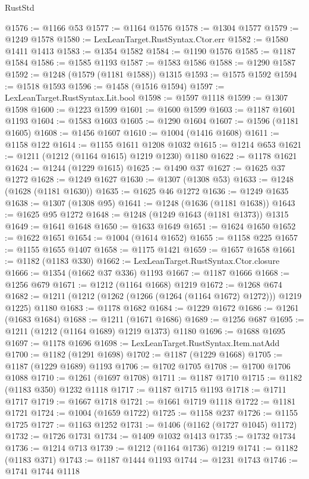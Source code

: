 \begin{lexlean}{RustStd}
\begin{coremodule}
@1576 := @1166 @53
@1577 := @1164 @1576
@1578 := @1304 @1577
@1579 := @1249 @1578
@1580 := LexLeanTarget.RustSyntax.Ctor.err
@1582 := @1580 @1411 @1413
@1583 := @1354 @1582
@1584 := @1190 @1576
@1585 := @1187 @1584
@1586 := @1585 @1193
@1587 := @1583 @1586
@1588 := @1290 @1587
@1592 := @1248 (@1579 (@1181 @1588)) @1315
@1593 := @1575 @1592
@1594 := @1518 @1593
@1596 := @1458 (@1516 @1594)
@1597 := LexLeanTarget.RustSyntax.Lit.bool
@1598 := @1597 @1118
@1599 := @1307 @1598
@1600 := @1223 @1599
@1601 := @1600 @1599
@1603 := @1187 @1601 @1193
@1604 := @1583 @1603
@1605 := @1290 @1604
@1607 := @1596 (@1181 @1605)
@1608 := @1456 @1607
@1610 := @1004 (@1416 @1608)
@1611 := @1158 @122
@1614 := @1155 @1611 @1208 @1032
@1615 := @1214 @653
@1621 := @1211 (@1212 (@1164 @1615) @1219 @1230) @1180
@1622 := @1178 @1621
@1624 := @1244 (@1229 @1615)
@1625 := @1490 @37
@1627 := @1625 @37 @1272
@1628 := @1249 @1627
@1630 := @1307 (@1308 @53)
@1633 := @1248 (@1628 (@1181 @1630))
@1635 := @1625 @46 @1272
@1636 := @1249 @1635
@1638 := @1307 (@1308 @95)
@1641 := @1248 (@1636 (@1181 @1638))
@1643 := @1625 @95 @1272
@1648 := @1248 (@1249 @1643 (@1181 @1373)) @1315
@1649 := @1641 @1648
@1650 := @1633 @1649
@1651 := @1624 @1650
@1652 := @1622 @1651
@1654 := @1004 (@1614 @1652)
@1655 := @1158 @225
@1657 := @1155 @1655 @1407
@1658 := @1175 @1421
@1659 := @1657 @1658
@1661 := @1182 (@1183 @330)
@1662 := LexLeanTarget.RustSyntax.Ctor.closure
@1666 := @1354 (@1662 @37 @336) @1193
@1667 := @1187 @1666
@1668 := @1256 @679
@1671 := @1212 (@1164 @1668) @1219
@1672 := @1268 @674
@1682 := @1211 (@1212 (@1262 (@1266 (@1264 (@1164 @1672) @1272))) @1219 @1225) @1180
@1683 := @1178 @1682
@1684 := @1229 @1672
@1686 := @1261 (@1683 @1684)
@1688 := @1211 (@1671 @1686)
@1689 := @1256 @687
@1695 := @1211 (@1212 (@1164 @1689) @1219 @1373) @1180
@1696 := @1688 @1695
@1697 := @1178 @1696
@1698 := LexLeanTarget.RustSyntax.Item.natAdd
@1700 := @1182 (@1291 @1698)
@1702 := @1187 (@1229 @1668)
@1705 := @1187 (@1229 @1689) @1193
@1706 := @1702 @1705
@1708 := @1700 @1706 @1088
@1710 := @1261 (@1697 @1708)
@1711 := @1187 @1710
@1715 := @1182 (@1183 @350) @1232 @1118
@1717 := @1187 @1715 @1193
@1718 := @1711 @1717
@1719 := @1667 @1718
@1721 := @1661 @1719 @1118
@1722 := @1181 @1721
@1724 := @1004 (@1659 @1722)
@1725 := @1158 @237
@1726 := @1155 @1725
@1727 := @1163 @1252
@1731 := @1406 (@1162 (@1727 @1045) @1172)
@1732 := @1726 @1731
@1734 := @1409 @1032 @1413
@1735 := @1732 @1734
@1736 := @1214 @713
@1739 := @1212 (@1164 @1736) @1219
@1741 := @1182 (@1183 @371)
@1743 := @1187 @1444 @1193
@1744 := @1231 @1743
@1746 := @1741 @1744 @1118

\end{coremodule}
\end{lexlean}
